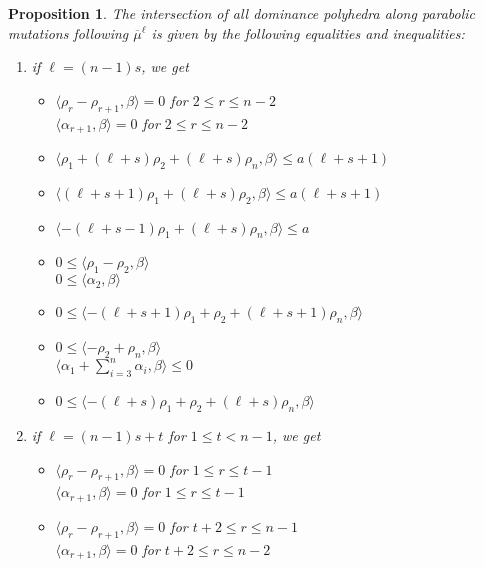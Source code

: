 \documentclass{amsart}
\newtheorem{proposition}[theorem]{Proposition}
\numberwithin{theorem}{section}
\begin{document}
  \begin{proposition}
    The intersection of all dominance polyhedra along parabolic mutations following $\overline{\mu}^\ell$ is given by the following equalities and inequalities:
    \begin{enumerate}
      \item if $\ell=(n-1)s$, we get 
        \begin{itemize}
          \item $\langle \rho_r-\rho_{r+1}, \beta\rangle = 0$ for $2\le r\le n-2$\\
            $\langle \alpha_{r+1}, \beta\rangle = 0$ for $2\le r\le n-2$\\
          \item $\langle \rho_1+(\ell+s)\rho_2+(\ell+s)\rho_n, \beta\rangle \le a(\ell+s+1)$
          \item $\langle (\ell+s+1)\rho_1+(\ell+s)\rho_2, \beta\rangle \le a(\ell+s+1)$
          \item $\langle -(\ell+s-1)\rho_1+(\ell+s)\rho_n, \beta\rangle \le a$
          \item $0 \le \langle \rho_1-\rho_2, \beta\rangle$\\
            $0 \le \langle \alpha_2, \beta\rangle$\\
          \item $0 \le \langle -(\ell+s+1)\rho_1+\rho_2+(\ell+s+1)\rho_n, \beta\rangle$
          \item $0 \le \langle -\rho_2+\rho_n, \beta\rangle$\\
            $\langle \alpha_1+\sum_{i=3}^n \alpha_i, \beta\rangle \le 0$\\
          \item $0 \le \langle -(\ell+s)\rho_1+\rho_2+(\ell+s)\rho_n, \beta\rangle$
        \end{itemize}
      \item if $\ell=(n-1)s+t$ for $1\le t < n-1$, we get 
        \begin{itemize}
          \item $\langle \rho_r-\rho_{r+1}, \beta\rangle = 0$ for $1\le r\le t-1$\\
            $\langle \alpha_{r+1}, \beta\rangle = 0$ for $1\le r\le t-1$\\
          \item $\langle \rho_r-\rho_{r+1}, \beta\rangle = 0$ for $t+2\le r\le n-1$\\
            $\langle \alpha_{r+1}, \beta\rangle = 0$ for $t+2\le r\le n-2$\\

\end{itemize}
\end{enumerate}
\end{proposition}
\end{document}
